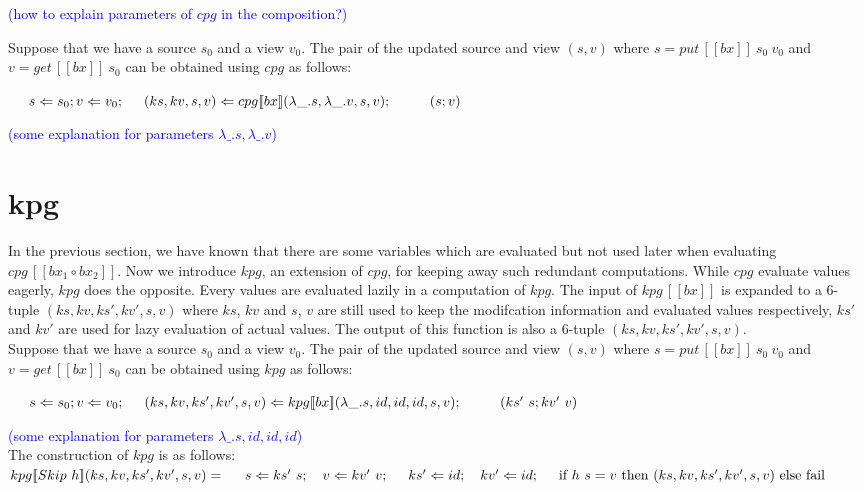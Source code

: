 \documentclass[runningheads]{llncs}
\newcommand{\tab}{\hspace*{5mm}}
\newcommand{\qtab}{\hspace*{5mm} \ \quad}
\newcommand{\putbx}[3]{put \, [\![#1]\!] \ #2 \ #3}
\newcommand{\getbx}[2]{get \, [\![#1]\!] \ #2}
\newcommand{\cpg}[5]{cpg [\![#1]\!] (#2, #3, #4, #5)}
\newcommand{\cpginline}[1]{cpg \, [\![#1]\!]}
\newcommand{\kpg}[7]{kpg [\![#1]\!] (#2, #3, #4, #5, #6, #7)}
\newcommand{\kpginline}[1]{kpg \, [\![#1]\!]}
\begin{document}
\textcolor{blue}{(how to explain parameters of $cpg$ in the composition?)}

Suppose that we have a source $s_0$ and a view $v_0$. The pair of the updated source and view $(s, v)$ where $s = \putbx{bx}{s_0}{v_0}$ and $v = \getbx{bx}{s_0}$ can be obtained using $cpg$ as follows:

    $\tab s \Leftarrow s_0; v \Leftarrow v_0;\\
    \tab (ks, kv, s, v) \Leftarrow \cpg{bx}{\lambda \_.s}{\lambda \_.v}{s}{v};\\
        \qtab (s; v)$

\textcolor{blue}{(some explanation for parameters $\lambda \_.s, \lambda \_.v$)}

\section{kpg}

In the previous section, we have known that there are some variables which are evaluated but not used later when evaluating $\cpginline{bx_1 \circ bx_2}$. Now we introduce $kpg$, an extension of $cpg$, for keeping away such redundant computations. 
While $cpg$ evaluate values eagerly, $kpg$ does the opposite. Every values are evaluated lazily in a computation of $kpg$. The input of $\kpginline{bx}$ is expanded to a 6-tuple $(ks, kv, ks', kv', s, v)$ where $ks$, $kv$ and $s$, $v$ are still used to keep the modifcation information and evaluated values respectively, $ks'$ and $kv'$ are used for lazy evaluation of actual values. The output of this function is also a 6-tuple $(ks, kv, ks', kv', s, v)$.\\

Suppose that we have a source $s_0$ and a view $v_0$. The pair of the updated source and view $(s, v)$ where $s = \putbx{bx}{s_0}{v_0}$ and $v = \getbx{bx}{s_0}$ can be obtained using $kpg$ as follows:

    $\tab s \Leftarrow s_0; v \Leftarrow v_0;\\
    \tab (ks, kv, ks', kv', s, v) \Leftarrow \kpg{bx}{\lambda \_.s}{id}{id}{id}{s}{v};\\
        \qtab (ks' \ s; kv' \ v)$

\textcolor{blue}{(some explanation for parameters $\lambda \_.s, id, id, id$)}\\

The construction of $kpg$ is as follows:\\

$\kpg{Skip \ h}{ks}{kv}{ks'}{kv'}{s}{v} =\\
    \tab s \Leftarrow ks' \ s; \quad v \Leftarrow kv' \ v;\\
    \tab ks' \Leftarrow id; \quad kv' \Leftarrow id;\\
    \tab \text{if} \ h \ s = v \ \text{then} \ (ks, kv, ks', kv', s, v) \ \text{else fail}$\\
\end{document}
